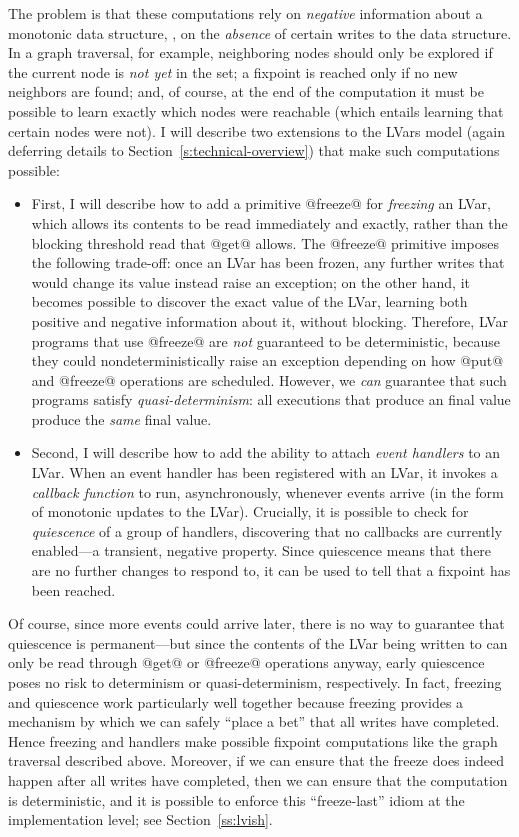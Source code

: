 \documentclass{article}
\begin{document}
The problem is that these computations rely on \emph{negative}
information about a monotonic data structure, \ie, on the
\emph{absence} of certain writes to the data structure.  In a graph
traversal, for example, neighboring nodes should only be explored if
the current node is \emph{not yet} in the set; a fixpoint is reached
only if no new neighbors are found; and, of course, at the end of the
computation it must be possible to learn exactly which nodes were
reachable (which entails learning that certain nodes were not).  I
will describe two extensions to the LVars model (again deferring
details to Section~\ref{s:technical-overview}) that make such
computations possible:
\begin{itemize}
\item First, I will describe how to add a primitive @freeze@ for
  \emph{freezing} an LVar, which allows its contents to be read
  immediately and exactly, rather than the blocking threshold read
  that @get@ allows.  The @freeze@ primitive imposes the following
  trade-off: once an LVar has been frozen, any further writes that
  would change its value instead raise an exception; on the other
  hand, it becomes possible to discover the exact value of the LVar,
  learning both positive and negative information about it, without
  blocking.  Therefore, LVar programs that use @freeze@ are \emph{not}
  guaranteed to be deterministic, because they could
  nondeterministically raise an exception depending on how @put@ and
  @freeze@ operations are scheduled.  However, we \emph{can} guarantee
  that such programs satisfy \emph{quasi-determinism}: all executions
  that produce an final value produce the \emph{same} final value.
\item Second, I will describe how to add the ability to attach
  \emph{event handlers} to an LVar.  When an event handler has been
  registered with an LVar, it invokes a \emph{callback function} to
  run, asynchronously, whenever events arrive (in the form of
  monotonic updates to the LVar).  Crucially, it is possible to check
  for \emph{quiescence} of a group of handlers, discovering that no
  callbacks are currently enabled---a transient, negative property.
  Since quiescence means that there are no further changes to respond
  to, it can be used to tell that a fixpoint has been reached.
\end{itemize}
Of course, since more events could arrive later, there is no way to
guarantee that quiescence is permanent---but since the contents of the
LVar being written to can only be read through @get@ or @freeze@
operations anyway, early quiescence poses no risk to determinism or
quasi-determinism, respectively.  In fact, freezing and quiescence
work particularly well together because freezing provides a mechanism
by which we can safely ``place a bet'' that all writes have completed.
Hence freezing and handlers make possible fixpoint computations like
the graph traversal described above.  Moreover, if we can ensure that
the freeze does indeed happen after all writes have completed, then we
can ensure that the computation is deterministic, and it is possible
to enforce this ``freeze-last'' idiom at the implementation level; see
Section~\ref{ss:lvish}.
\end{document}
